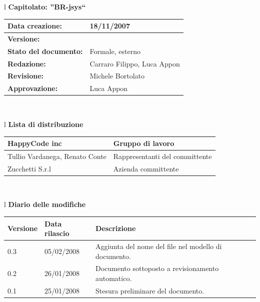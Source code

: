 \documentclass[11pt,titlepage,a4paper]{report}
\begin{document}
\begin{center}
\thispagestyle{plain}
\begin{table}[htbp]
\large{
\begin{tabular}{l}
\Large{\textbf{\textsf{Capitolato: ''BR-jsys``}}} \\
\begin{tabular}{||p{6cm}||p{6cm}||}
\hline
\textbf{Data creazione:} & 18/11/2007 \\ \hline
\textbf{Versione:} & \lv \\ \hline
\textbf{Stato del documento:} & Formale, esterno \\ \hline
\textbf{Redazione:} & Carraro Filippo, Luca Appon \\ \hline
\textbf{Revisione:} & Michele Bortolato   \\ \hline
\textbf{Approvazione:}  & Luca Appon \\ \hline
\end{tabular} \\
\end{tabular}
}
\end{table}

\begin{table}[hbtp]
\large{
\begin{tabular}{l}
\Large{\textbf{\textsf{Lista di distribuzione}}} \\

\begin{tabular}{||p{6cm}||p{6cm}||} \hline
{HappyCode inc}& Gruppo di lavoro\\ \hline
{Tullio Vardanega, Renato Conte}& Rappresentanti del committente \\ \hline
{Zucchetti S.r.l}& Azienda committente\\ \hline
\end{tabular} \\
\end{tabular}
}
\end{table}
\begin{table}[hbtp]
\large{
\begin{tabular}{l}
\Large{\textbf{\textsf{Diario delle modifiche}}} \\
\begin{tabular}{||p{2cm}||p{3.5cm}||p{6cm}||} \hline
\textbf{Versione} & \textbf{Data rilascio} & \textbf{Descrizione} \\ \hline
0.3 & 05/02/2008 & Aggiunta del nome del file nel modello di documento.\\ \hline
0.2 & 26/01/2008 & Documento sottoposto a revisionamento automatico.\\ \hline
0.1 & 25/01/2008 & Stesura preliminare del documento. \\ \hline

\end{tabular} \\
\end{tabular}

}
\end{table}
\end{center}
\newpage
\end{document}

